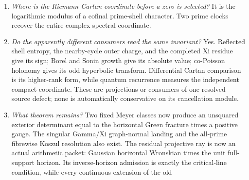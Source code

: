 \documentclass[11pt]{article}
\theoremstyle{definition}
\theoremstyle{remark}
\begin{document}
\begin{enumerate}[leftmargin=2.2em]
      Source-pointed polarized exact descent is the linear, stable refinement:
      unique gluing plus stable,
      correctly normalized recovery.  Full coefficient preservation and
      strict Hermitian recalibration do not commute: total tests force the
      reporter and make every coefficient-preserving endomorphism the
      identity.  Exact descent must therefore precede polarization.  Serial conservativity is edgewise on
      propagated sectors; parallel conservativity is absence of a common
      marginal radical; Hilbert positivity is contractive factorization.
      Exact range is a further irreversible gate: a continuous injective
      consumer carries every closure-only value to another closure-only
      value.  Hence information must be resolved before a lossy quotient,
      and a missing source primitive cannot be manufactured by completion.
      Completed coface saturation adds the same noncommutation in the
      Riemann complex: provenance must be resolved before closure and
      quotient.  Forced order is resolve, descend exactly, strictify the
      singular source range, then polarize.
\item \emph{Where is the Riemann Cartan coordinate before a zero is selected?}
      It is the logarithmic modulus of a cofinal prime-shell character.
      Two prime clocks recover the entire complex spectral coordinate.
\item \emph{Do the apparently different consumers read the same invariant?}
      Yes.  Reflected shell entropy, the nearby-cycle outer charge, and
      the completed Xi residue give its sign; Borel and Sonin growth give
      its absolute value; co-Poisson holonomy gives its odd hyperbolic
      transform.  Differential Cartan comparison is its higher-rank form,
      while quantum recurrence measures the independent compact coordinate.
      These are projections or consumers of one resolved source defect;
      none is automatically conservative on its cancellation module.
\item \emph{What theorem remains?}
      Two fixed Meyer classes now produce an unsquared exterior determinant
      equal to the horizontal Green fracture times a positive gauge.  The
      singular Gamma/Xi graph-normal landing and the all-prime fibrewise
      Koszul resolution also exist.  The residual projective ray is now an
      actual arithmetic packet: Gaussian horizontal Wronskian times the unit
      full-support horizon.  Its inverse-horizon admission is exactly the
      critical-line condition, while every continuous extension of the old

\end{enumerate}
\end{document}

